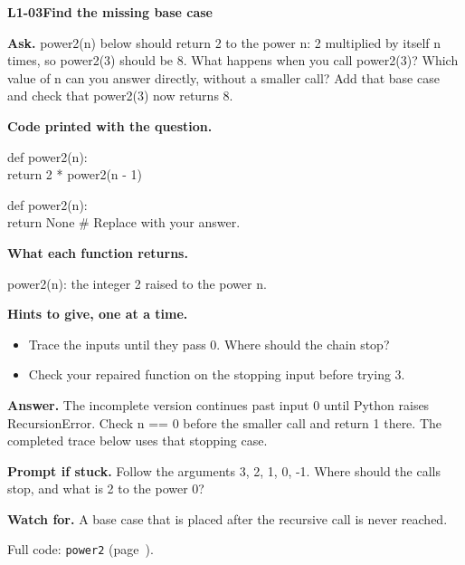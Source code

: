 \documentclass[11pt,a4paper]{article}
\begin{document}
\noindent\begin{minipage}{\textwidth}
{\color{teal}\textbf{L1-03}}\quad \textbf{Find the missing base case}\par\smallskip
\textbf{Ask.} power2(n) below should return 2 to the power n: 2 multiplied by itself n times, so power2(3) should be 8. What happens when you call power2(3)? Which value of n can you answer directly, without a smaller call? Add that base case and check that power2(3) now returns 8.\par\smallskip
{\small\textbf{Code printed with the question.}}\par\smallskip\noindent\colorbox{codepaper}{\parbox{\dimexpr\linewidth-2\fboxsep\relax}{\small\ttfamily\raggedright def power2(n):\\\hspace*{2.4em}return 2 * power2(n - 1)}}\par
\smallskip\par{}\par\smallskip\noindent\colorbox{codepaper}{\parbox{\dimexpr\linewidth-2\fboxsep\relax}{\small\ttfamily\raggedright def power2(n):\\\hspace*{2.4em}return None  \# Replace with your answer.}}\par
{\small\textbf{What each function returns.}\par power2(n): the integer 2 raised to the power n.\par }
{\small\textbf{Hints to give, one at a time.}}\begin{itemize}\item Trace the inputs until they pass 0. Where should the chain stop?\item Check your repaired function on the stopping input before trying 3.\end{itemize}
\textbf{Answer.} The incomplete version continues past input 0 until Python raises RecursionError. Check n == 0 before the smaller call and return 1 there. The completed trace below uses that stopping case.\par\smallskip
\textbf{Prompt if stuck.} Follow the arguments 3, 2, 1, 0, -1. Where should the calls stop, and what is 2 to the power 0?\par\smallskip
\textbf{Watch for.} A base case that is placed after the recursive call is never reached.\par\smallskip Full code: \texttt{power2} (page~\pageref{L1-code-power2}).
\end{minipage}\par{}\medskip
\end{document}
